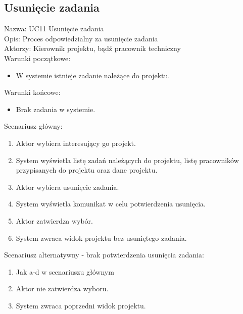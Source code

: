 \subsection{Usunięcie zadania}
Nazwa: UC11 Usunięcie zadania\\
Opis: Proces odpowiedzialny za usunięcie zadania\\
Aktorzy: Kierownik projektu, bądź pracownik techniczny \\
Warunki początkowe:
\begin{itemize}
\item W systemie istnieje zadanie należące do projektu.
\end{itemize}
Warunki końcowe:
\begin{itemize}
\item Brak zadania w systemie.
\end{itemize}
Scenariusz główny:
\begin{enumerate}
\item Aktor wybiera interesujący go projekt.
\item System wyświetla listę zadań należących do projektu, listę pracowników przypisanych do projektu oraz dane projektu.
\item Aktor wybiera usunięcie zadania.
\item System wyświetla komunikat w celu potwierdzenia usunięcia.
\item Aktor zatwierdza wybór.
\item System zwraca widok projektu bez usuniętego zadania.
\end{enumerate}
Scenariusz alternatywny - brak potwierdzenia usunięcia zadania: 
\begin{enumerate}
\item Jak a-d w scenariuszu głównym
\item Aktor nie zatwierdza wyboru.
\item System zwraca poprzedni widok projektu.
\end{enumerate}

